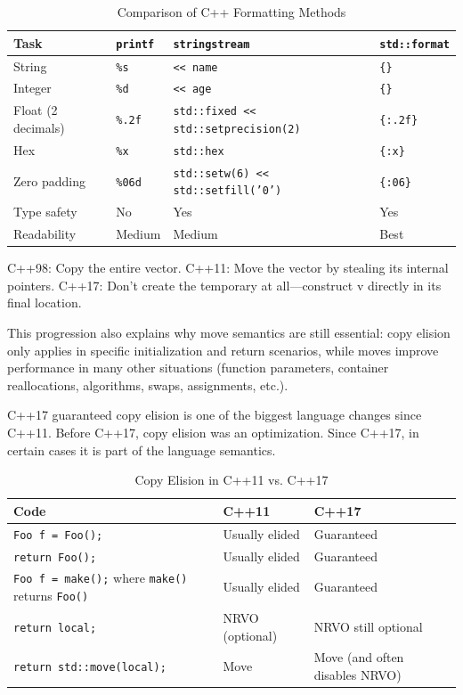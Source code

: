 \documentclass[a4paper,11pt,twoside]{book}
\begin{document}
\begin{itemize}
\begin{table}[ht]
\centering
\begin{tabular}{|l|l|l|l|}
\hline
\textbf{Task} &
\textbf{\texttt{printf}} &
\textbf{\texttt{stringstream}} &
\textbf{\texttt{std::format}} \\
\hline
String &
\texttt{\%s} &
\texttt{<< name} &
\texttt{\{\}} \\
\hline
Integer &
\texttt{\%d} &
\texttt{<< age} &
\texttt{\{\}} \\
\hline
Float (2 decimals) &
\texttt{\%.2f} &
\texttt{std::fixed << std::setprecision(2)} &
\texttt{\{:.2f\}} \\
\hline
Hex &
\texttt{\%x} &
\texttt{std::hex} &
\texttt{\{:x\}} \\
\hline
Zero padding &
\texttt{\%06d} &
\texttt{std::setw(6) << std::setfill('0')} &
\texttt{\{:06\}} \\
\hline
Type safety &
No &
Yes &
Yes \\
\hline
Readability &
Medium &
Medium &
Best \\
\hline
\end{tabular}
\caption{Comparison of C++ Formatting Methods}
\label{tab:format_comparison}
\end{table}
C++98: Copy the entire vector.
C++11: Move the vector by stealing its internal pointers.
C++17: Don't create the temporary at all—construct v directly in its final location.

This progression also explains why move semantics are still essential: copy elision only applies in specific initialization and return scenarios, while moves improve performance in many other situations (function parameters, container reallocations, algorithms, swaps, assignments, etc.).

C++17 guaranteed copy elision is one of the biggest language changes since C++11. Before C++17, copy elision was an optimization. Since C++17, in certain cases it is part of the language semantics.

\begin{table}[ht]
\centering
\begin{tabular}{|l|l|l|}
\hline
\textbf{Code} & \textbf{C++11} & \textbf{C++17} \\
\hline
\texttt{Foo f = Foo();} &
Usually elided &
Guaranteed \\
\hline
\texttt{return Foo();} &
Usually elided &
Guaranteed \\
\hline
\texttt{Foo f = make();} where \texttt{make()} returns \texttt{Foo()} &
Usually elided &
Guaranteed \\
\hline
\texttt{return local;} &
NRVO (optional) &
NRVO still optional \\
\hline
\texttt{return std::move(local);} &
Move &
Move (and often disables NRVO) \\
\hline
\end{tabular}
\caption{Copy Elision in C++11 vs. C++17}
\label{tab:copy_elision}
\end{table}




\end{itemize}
\end{document}
